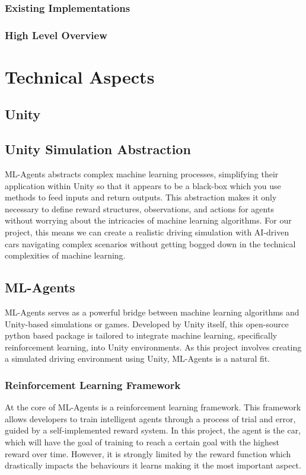 \documentclass{article}
\begin{document}
\subsubsection{Existing Implementations}
\lipsum[2][1]

\subsubsection{High Level Overview}
\lipsum[2][1]

\section{Technical Aspects}
\lipsum[2][1]

\subsection{Unity}

\lipsum[2][1]

\subsection{Unity Simulation Abstraction}
ML-Agents abstracts complex machine learning processes, simplifying their application within Unity so that it appears to be a black-box which you use methods to feed inputs and return outputs. This abstraction makes it only necessary to define reward structures, observations, and actions for agents without worrying about the intricacies of machine learning algorithms. For our project, this means we can create a realistic driving simulation with AI-driven cars navigating complex scenarios without getting bogged down in the technical complexities of machine learning.

\subsection{ML-Agents}
ML-Agents serves as a powerful bridge between machine learning algorithms and Unity-based simulations or games. Developed by Unity itself, this open-source python based package is tailored to integrate machine learning, specifically reinforcement learning, into Unity environments. As this project involves creating a simulated driving environment using Unity, ML-Agents is a natural fit.

\subsubsection{Reinforcement Learning Framework}
At the core of ML-Agents is a reinforcement learning framework. This framework allows developers to train intelligent agents through a process of trial and error, guided by a self-implemented reward system. In this project, the agent is the car, which will have the goal of training to reach a certain goal with the highest reward over time. However, it is strongly limited by the reward function which drastically impacts the behaviours it learns making it the most important aspect.
\end{document}
